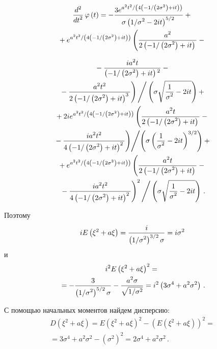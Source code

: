 \begin{multicols}{2}
\vspace*{-12pt}
    
\noindent
\begin{multline*}  
    \displaystyle\frac{\displaystyle d^2\mathstrut}{\displaystyle dt^2\mathstrut}\,\varphi\left( t\right) = 
    -\displaystyle\frac{\displaystyle 3 e^{{a^2 t^2}/\left({4 \left(-{1}/\left({2 \sigma^2}\right)+i t\right)}\right)}\mathstrut}{\displaystyle \sigma \left({1}/{\sigma^2}-2 it\right)^{5/2}\mathstrut}+{}\\
    {}+
    e^{{a^2 t^2}/\left({4 \left(-{1}/\left({2\sigma^2}\right)+it\right)}\right)} 
    \left(
    \displaystyle\frac{\displaystyle a^2\mathstrut}{\displaystyle 2 \left(-{1}/\left({2 \sigma^2}\right)+i t\right)\mathstrut}-{}\right.
    \end{multline*}

\noindent
\begin{multline*}
    {}-
    \displaystyle\frac{\displaystyle i a^2 t\mathstrut}{\displaystyle \left(-{1}/\left({2
            \sigma^2}\right)+i t\right){}^2\mathstrut}-{}\\
\left.            {}-
            \displaystyle\frac{\displaystyle a^2 t^2\mathstrut}{\displaystyle 2 \left(-{1}/\left({2\sigma^2}\right)+it\right)^3\mathstrut}\right)
            \Bigg/
            \left(\sigma\sqrt{\displaystyle\frac{\displaystyle 1\mathstrut}{\displaystyle \sigma^2\mathstrut}-2 it}\right)+{}\\
{}+ 2 i e^{{a^2 t^2}/\left({4 \left(-{1}/\left({2\sigma^2}\right)+it\right)}\right)} 
\left(
\displaystyle\frac{\displaystyle a^2 t\mathstrut}{\displaystyle 2 \left(-{1}/\left({2 \sigma^2}\right)+i t\right)\mathstrut}-{}\right.\\
\left.{}-
\displaystyle\frac{\displaystyle i a^2 t^2\mathstrut}{\displaystyle 4 \left(-{1}/\left({2 \sigma^2}\right)+it \right)^2\mathstrut}\right)
\!\Bigg/\!
\left(\sigma\left(\displaystyle\frac{\displaystyle 1\mathstrut}{\displaystyle \sigma^2\mathstrut}-2 i t\right)^{3/2}\right)+{}\\
{}+
e^{{a^2 t^2}/\left({4 \left(-{1}/\left({2\sigma^2}\right)+i t\right)}\right)} 
\left(
\displaystyle\frac{\displaystyle a^2 t\mathstrut}{\displaystyle 2 \left(-{1}/\left({2 \sigma^2}\right)+i t\right)\mathstrut}-{}\right.\\
\left.{}-
\displaystyle\frac{\displaystyle ia^2 t^2\mathstrut}{\displaystyle 4 \left(-{1}/\left({2 \sigma^2}\right)+i t\right)^2\mathstrut}\right)^2\Bigg/
\left(\sigma\sqrt{\displaystyle\frac{\displaystyle 1\mathstrut}{\displaystyle \sigma^2\mathstrut}-2 i t}\right)\,.
\end{multline*}
   
\noindent
Поэтому
$$  
iE\left( \xi^{2} + a\xi\right)  = \displaystyle\frac{\displaystyle i\mathstrut}{\displaystyle \left({1}/{\sigma^2}\right)^{3/2} \sigma \mathstrut}= 
i \sigma^2
$$  
и
\begin{multline*}
i^2 E\left( \xi^{2} + a\xi\right)^2 =  {}\\
{}=
-\displaystyle\frac{\displaystyle 3\mathstrut}{\displaystyle \left({1}/{\sigma^2}\right)^{5/2} \sigma\mathstrut}-
\displaystyle\frac{\displaystyle a^2 \sigma\mathstrut}{\displaystyle \sqrt{{1}/{\sigma^2}}\mathstrut} = i^2\left(3\sigma^4 + a^2\sigma^2\right)\,.
\end{multline*} 

С помощью начальных моментов найдем дисперсию:
\begin{multline*}  
    D\left( \xi^{2} + a\xi \right)  =  E\left( \xi^{2} + a\xi\right)^2 - 
    \left( E\left(\xi^{2} + a\xi \right)\right)^2 ={}\\
    {}= 3\sigma^4 + a^2\sigma^2 - \left(\sigma^2\right)^2 = 2\sigma^4 + a^2\sigma^2 \,.
\end{multline*}


\end{multicols}
